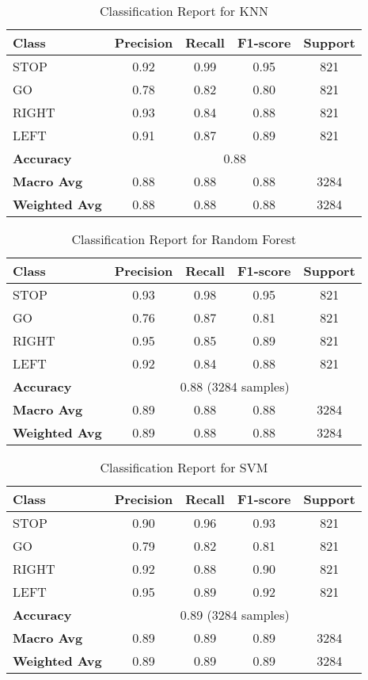 \begin{table}[h]
\centering
\caption{Classification Report for KNN}
\begin{tabular}{lcccc}
\hline
\textbf{Class} & \textbf{Precision} & \textbf{Recall} & \textbf{F1-score} & \textbf{Support} \\
\hline
STOP  & 0.92 & 0.99 & 0.95 & 821 \\
GO    & 0.78 & 0.82 & 0.80 & 821 \\
RIGHT & 0.93 & 0.84 & 0.88 & 821 \\
LEFT  & 0.91 & 0.87 & 0.89 & 821 \\
\hline
\textbf{Accuracy} & \multicolumn{4}{c}{0.88} \\
\textbf{Macro Avg} & 0.88 & 0.88 & 0.88 & 3284 \\
\textbf{Weighted Avg} & 0.88 & 0.88 & 0.88 & 3284 \\
\hline
\end{tabular}
\label{tab:knn_classification_report}
\end{table}


\begin{table}[h]
\centering
\caption{Classification Report for Random Forest}
\begin{tabular}{lcccc}
\hline
\textbf{Class} & \textbf{Precision} & \textbf{Recall} & \textbf{F1-score} & \textbf{Support} \\
\hline
STOP  & 0.93 & 0.98 & 0.95 & 821 \\
GO    & 0.76 & 0.87 & 0.81 & 821 \\
RIGHT & 0.95 & 0.85 & 0.89 & 821 \\
LEFT  & 0.92 & 0.84 & 0.88 & 821 \\
\hline
\textbf{Accuracy} & \multicolumn{4}{c}{0.88 (3284 samples)} \\
\textbf{Macro Avg} & 0.89 & 0.88 & 0.88 & 3284 \\
\textbf{Weighted Avg} & 0.89 & 0.88 & 0.88 & 3284 \\
\hline
\end{tabular}
\label{tab:random_forest_classification_report}
\end{table}


\begin{table}[h]
\centering
\caption{Classification Report for SVM}
\begin{tabular}{lcccc}
\hline
\textbf{Class} & \textbf{Precision} & \textbf{Recall} & \textbf{F1-score} & \textbf{Support} \\
\hline
STOP  & 0.90 & 0.96 & 0.93 & 821 \\
GO    & 0.79 & 0.82 & 0.81 & 821 \\
RIGHT & 0.92 & 0.88 & 0.90 & 821 \\
LEFT  & 0.95 & 0.89 & 0.92 & 821 \\
\hline
\textbf{Accuracy} & \multicolumn{4}{c}{0.89 (3284 samples)} \\
\textbf{Macro Avg} & 0.89 & 0.89 & 0.89 & 3284 \\
\textbf{Weighted Avg} & 0.89 & 0.89 & 0.89 & 3284 \\
\hline
\end{tabular}
\label{tab:svm_classification_report}
\end{table}
